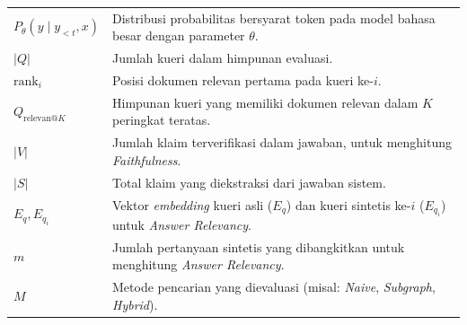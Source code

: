 \documentclass{SkripsiUnesa}
\begin{document}
\begin{longtable}{p{} p{}}
    $P_\theta(y \mid y_{<t}, x)$            & Distribusi probabilitas bersyarat token pada model bahasa besar dengan parameter $\theta$.                          \\

    $|Q|$                                   & Jumlah kueri dalam himpunan evaluasi.                                                                               \\
    $\text{rank}_i$                         & Posisi dokumen relevan pertama pada kueri ke-$i$.                                                                   \\
    $Q_{\text{relevan@}K}$                  & Himpunan kueri yang memiliki dokumen relevan dalam $K$ peringkat teratas.                                           \\
    $|V|$                                   & Jumlah klaim terverifikasi dalam jawaban, untuk menghitung \textit{Faithfulness}.                                   \\
    $|S|$                                   & Total klaim yang diekstraksi dari jawaban sistem.                                                                   \\
    $E_q, E_{q_i}$                          & Vektor \textit{embedding} kueri asli ($E_q$) dan kueri sintetis ke-$i$ ($E_{q_i}$) untuk \textit{Answer Relevancy}. \\
    $m$                                     & Jumlah pertanyaan sintetis yang dibangkitkan untuk menghitung \textit{Answer Relevancy}.                            \\
    $M$                                     & Metode pencarian yang dievaluasi (misal: \textit{Naive}, \textit{Subgraph}, \textit{Hybrid}).                       \\
\end{longtable}

\Inti











\BukaLampiran


\end{document}
